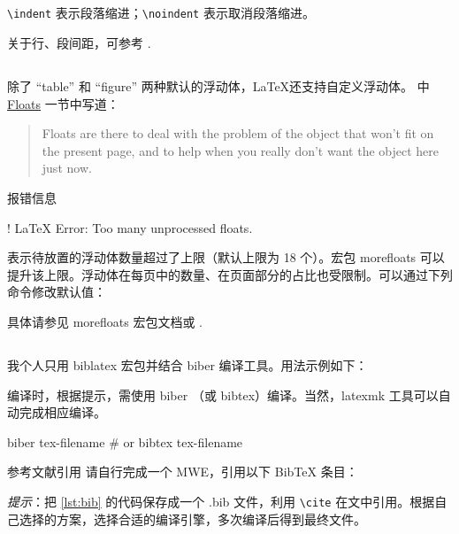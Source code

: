 \subsection[缩进和行、段间距]{}
\verb+\indent+ 表示段落缩进；\verb+\noindent+ 表示取消段落缩进。

关于行、段间距，可参考 \cite{jianshu,liam}.

\subsection[浮动体]{}
除了 ``table'' 和 ``figure'' 两种默认的浮动体，\LaTeX 还支持自定义浮动体。\cite{wiki:floats} 中 \href{https://en.wikibooks.org/wiki/LaTeX/Floats,\_Figures\_and\_Captions\#Floats}{Floats} 一节中写道：
\begin{quote}
  Floats are there to deal with the problem of the object that won't fit on the present page, and to help when you really don't want the object here just now. 
\end{quote}

报错信息
\begin{bashlst}
! LaTeX Error: Too many unprocessed floats.
\end{bashlst}
表示待放置的浮动体数量超过了上限（默认上限为 18 个）。宏包 morefloats 可以提升该上限。浮动体在每页中的数量、在页面部分的占比也受限制。可以通过下列命令修改默认值：
\begin{texlst}
\setcounter{topnumber}{2}
\setcounter{bottomnumber}{2}
\setcounter{totalnumber}{4}
\renewcommand{\topfraction}{0.85}
\renewcommand{\bottomfraction}{0.85}
\renewcommand{\textfraction}{0.15}
\renewcommand{\floatpagefraction}{0.7}
\end{texlst}
具体请参见 morefloats 宏包文档或 \cite{placement}.

\subsection[参考文献]{}
我个人只用 biblatex 宏包并结合 biber 编译工具。用法示例如下：
\begin{texlst}
\usepackage[]{biblatex}


\printbibliography[]
\end{texlst}
编译时，根据提示，需使用 biber （或 bibtex）编译。当然，latexmk 工具可以自动完成相应编译。
\begin{bashlst}
biber tex-filename
# or bibtex tex-filename
\end{bashlst}

\begin{Ex}{参考文献引用}
请自行完成一个 MWE，引用以下 BibTeX 条目：

\myhrule

\emph{提示}：把 \ref{lst:bib} 的代码保存成一个 .bib 文件，利用 \verb+\cite+ 在文中引用。根据自己选择的方案，选择合适的编译引擎，多次编译后得到最终文件。
\end{Ex}